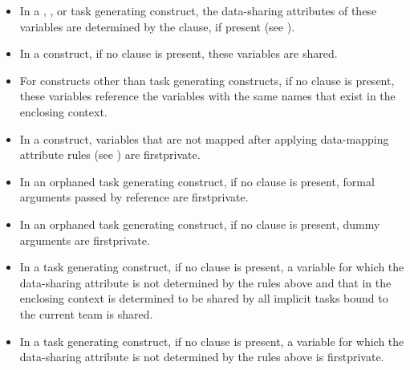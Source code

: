 {{{{\begin{itemize}
\item In a , , or task generating construct, the data-sharing attributes of these variables are
determined by the  clause, if present (see
).

\item In a  construct, if no  clause is present, these variables are 
shared.

\item For constructs other than task generating constructs, if no  clause is present, these variables reference the variables with the same names that exist in the enclosing context.

\item In a  construct, variables that are not mapped after applying data-mapping attribute rules (see ) are firstprivate.
\end{itemize}

\cppspecificstart
\begin{itemize}
\item In an orphaned task generating
construct, if no  clause is present, formal arguments passed by reference are firstprivate.
\end{itemize}
\cppspecificend

\fortranspecificstart
\begin{itemize}
\item In an orphaned task generating
construct, if no  clause is present, dummy arguments 
are firstprivate.
\end{itemize}
\fortranspecificend

\begin{itemize}
\item In a task generating construct, if no  clause is present, a variable
for which the data-sharing attribute is not determined by the rules above
and that in the enclosing context is determined to be shared by all implicit tasks bound
to the current team is shared.

\item In a task generating construct, if no
 clause is present, a variable for which the data-sharing 
attribute is not determined by the rules above is firstprivate.
\end{itemize}

}}}}
